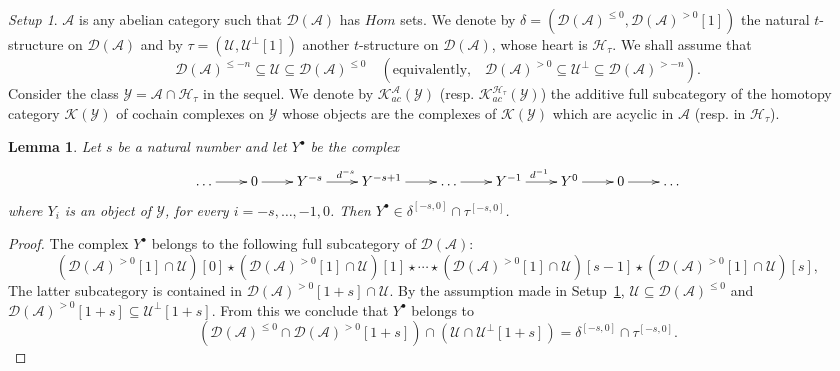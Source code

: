 \documentclass{proc-l}
\newtheorem{lemma}[theorem]{Lemma}
\theoremstyle{definition}
\theoremstyle{remark}
\newtheorem{setup}{Setup}
\numberwithin{equation}{section}
\begin{document}
\begin{setup}\label{setup1}$\mathcal{A}$ is any abelian category such that $\mathcal{D}(\mathcal{A})$ has $Hom$ sets. We denote by $\delta=(\mathcal{D}(\mathcal{A})^{\leq0},\mathcal{D}(\mathcal{A})^{>0}[1])$ the natural $t$-structure on $\mathcal{D}(\mathcal{A})$ and by $\tau=(\mathcal{U},\mathcal{U}^\perp[1])$ another $t$-structure on 
$\mathcal{D}(\mathcal{A})$, whose heart is $\mathcal{H}_\tau$. We shall assume that 
\[\mathcal{D}(\mathcal{A})^{\leq-n}\subseteq \mathcal{U} \subseteq \mathcal{D}(\mathcal{A})^{\leq0} \quad (\text{equivalently,}\quad
\mathcal{D}(\mathcal{A})^{>0}\subseteq \mathcal{U}^\perp \subseteq \mathcal{D}(\mathcal{A})^{>{-n}}). 
\]
Consider the class $\mathcal{Y}=\mathcal{A}\cap\mathcal{H}_\tau$ in the sequel. We denote by 
$\mathcal{K}_{ac}^{\mathcal{A}}(\mathcal{Y})$ (resp. $\mathcal{K}_{ac}^{\mathcal{H}_\tau}(\mathcal{Y})$) the additive full subcategory of the homotopy category $\mathcal{K}(\mathcal{Y})$ of cochain complexes on $\mathcal{Y}$ whose objects are the complexes of $\mathcal{K}(\mathcal{Y})$ which are acyclic in 
$\mathcal{A}$ (resp. in $\mathcal{H}_\tau$).
\end{setup}



\begin{lemma}\label{cohom}
Let $s$ be a natural number and let $Y^\bullet$ be the complex
\[
\xymatrix@-2pt{\dots \ar[r] &0 \ar[r] & Y^{-s} \ar^{d^{-s}}[r]& Y^{-s+1} \ar[r]& \dots \ar[r]& Y^{-1} \ar^{d^{-1}}[r]& Y^{0} \ar[r]& 0\ar[r]& \dots}
\]
where $Y_i$ is an object of $\mathcal{Y}$, for every $i=-s, \dots, -1, 0$. Then $Y^\bullet \in \delta^{[-s,0]} \cap \tau^{[-s,0]}$.
\end{lemma}
\begin{proof}
The complex $Y^\bullet$ belongs to the following full subcategory of $\mathcal{D}(\mathcal{A})$:
\[
(\mathcal{D}(\mathcal{A})^{>0}[1] \cap \mathcal{U})[0] \star (\mathcal{D}(\mathcal{A})^{>0}[1] \cap \mathcal{U})[1] \star \cdots \star (\mathcal{D}(\mathcal{A})^{>0}[1] \cap \mathcal{U})[s-1] \star (\mathcal{D}(\mathcal{A})^{>0}[1] \cap \mathcal{U})[s],
\]
The latter subcategory is contained in $\mathcal{D}(\mathcal{A})^{>0}[1+s] \cap \mathcal U$. By the assumption made in Setup~\ref{setup1}, 
$\mathcal U \subseteq \mathcal{D}(\mathcal{A})^{\leq0}$ and $\mathcal{D}(\mathcal{A})^{>0}[1+s]\subseteq \mathcal{U}^\perp[1+s]$. From this we conclude that $Y^\bullet$ belongs to
\[
(\mathcal{D}(\mathcal{A})^{\leq0}\cap \mathcal{D}(\mathcal{A})^{>0}[1+s])\cap (\mathcal{U}\cap \mathcal{U}^\perp[1+s])=\delta^{[-s,0]} \cap \tau^{[-s,0]}.
\]
\end{proof}
\end{document}
